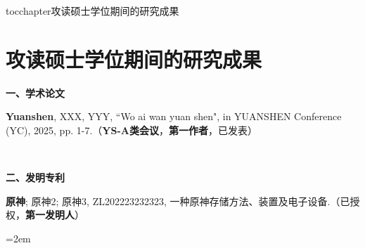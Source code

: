 
\newenvironment{thepublications}{\wuhao\song}

\addcontentsline{toc}{chapter}{攻读硕士学位期间的研究成果}%
\chapter*{\centering\sanhao\heiti\bfseries\textbf{攻读硕士学位期间的研究成果}}
\titlespacing{\chapter}{0pt}{24pt}{18pt}

\begin{thepublications}

\setlength{\parindent}{0em}

\textbf{一、学术论文}

\begin{publist}
    \item \textbf{Yuanshen}, XXX, YYY, ``Wo ai wan yuan shen", in YUANSHEN Conference (YC), 2025, pp. 1-7.（\textbf{YS-A类会议}，\textbf{第一作者}，已发表）
\end{publist}

~

\textbf{二、发明专利}
  
\begin{publist}
    \item \textbf{原神}; 原神2; 原神3, ZL202223232323, 一种原神存储方法、装置及电子设备.（已授权，\textbf{第一发明人}）
\end{publist}

\vfill
{}\hangindent=2em\noindent
\setlength{\parindent}{2em}
\end{thepublications}

